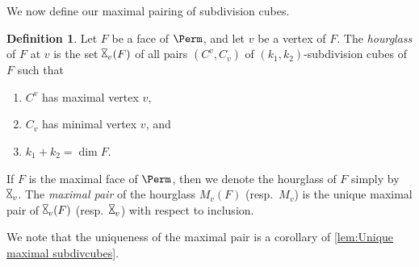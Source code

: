 \documentclass{amsart}
\newcommand{\darkblue}{\color{darkblue}} %
\theoremstyle{definition}
\newtheorem{definition}[theorem]{Definition}
\newcommand{\resp}{resp.~} %
\newcommand{\defn}[1]{\textsl{\darkblue #1}} %
\newcommand{\hour}{\raisebox{0.065cm}{\rotatebox[origin=c]{90}{$\bowtie$}}_v}
\newcommand{\maxsubdivpairsv}{M_v}
\begin{document}
We now define our maximal pairing of subdivision cubes.

\begin{definition} 
\label{def:hourglass}
Let $F$ be a face of $\Perm$, and let $v$ be a vertex of $F$. 
The \defn{hourglass} of $F$ at $v$ is the set $\hour(F)$ of all pairs $(C^v,C_v)$ of $(k_1,k_2)$-subdivision cubes of $F$ such that
\begin{enumerate}
	\item $C^v$ has maximal vertex $v$,
	\item $C_v$ has minimal vertex $v$, and
	\item $k_1+k_2 = \dim F$.
\end{enumerate}
If $F$ is the maximal face of $\Perm$, then we denote the hourglass of $F$ simply by $\hour$.
The \defn{maximal pair} of the hourglass $\maxsubdivpairsv(F)$ (\resp $\maxsubdivpairsv$) is the unique maximal pair of $\hour(F)$ (\resp $\hour$) with respect to inclusion.
\end{definition}

We note that the uniqueness of the maximal pair is a corollary of \cref{lem:Unique maximal subdivcubes}.
\end{document}

